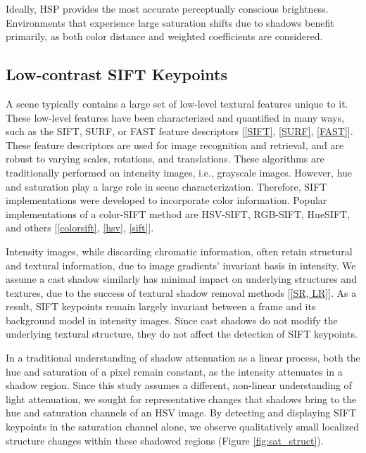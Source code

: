 Ideally, HSP provides the most accurate perceptually conscious brightness. Environments that experience large saturation shifts due to shadows benefit primarily, as both color distance and weighted coefficients are considered.

\subsection{Low-contrast SIFT Keypoints} \label{section:lowcSIFT}

A scene typically contains a large set of low-level textural features unique to it. These low-level features have been characterized and quantified in many ways, such as the SIFT, SURF, or FAST feature descriptors [\ref{SIFT}, \ref{SURF}, \ref{FAST}]. These feature descriptors are used for image recognition and retrieval, and are robust to varying scales, rotations, and translations. These algorithms are traditionally performed on intensity images, i.e., grayscale images. However, hue and saturation play a large role in scene characterization. Therefore, SIFT implementations were developed to incorporate color information. Popular implementations of a color-SIFT method are HSV-SIFT, RGB-SIFT, HueSIFT, and others [\ref{colorsift}, \ref{hsv}, \ref{sift}].

Intensity images, while discarding chromatic information, often retain structural and textural information, due to image gradients' invariant basis in intensity. We assume a cast shadow similarly has minimal impact on underlying structures and textures, due to the success of textural shadow removal methods [\ref{SR, LR}]. As a result, SIFT keypoints remain largely invariant between a frame and its background model in intensity images. Since cast shadows do not modify the underlying textural structure, they do not affect the detection of SIFT keypoints.

In a traditional understanding of shadow attenuation as a linear process, both the hue and saturation of a pixel remain constant, as the intensity attenuates in a shadow region. Since this study assumes a different, non-linear understanding of light attenuation, we sought for representative changes that shadows bring to the hue and saturation channels of an HSV image. By detecting and displaying SIFT keypoints in the saturation channel alone, we observe qualitatively small localized structure changes within these shadowed regions (Figure \ref{fig:sat_struct}).

